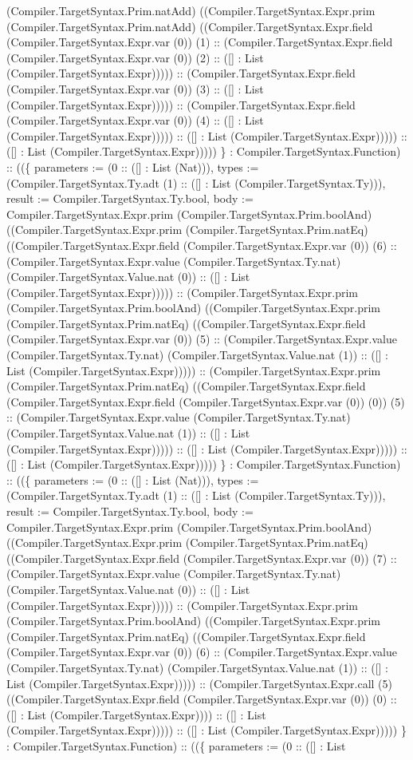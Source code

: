 \documentclass[11pt]{article}
\begin{document}
(Compiler.TargetSyntax.Prim.natAdd) ((Compiler.TargetSyntax.Expr.prim (Compiler.TargetSyntax.Prim.natAdd) ((Compiler.TargetSyntax.Expr.field (Compiler.TargetSyntax.Expr.var (0)) (1) :: (Compiler.TargetSyntax.Expr.field (Compiler.TargetSyntax.Expr.var (0)) (2) :: ([] : List (Compiler.TargetSyntax.Expr))))) :: (Compiler.TargetSyntax.Expr.field (Compiler.TargetSyntax.Expr.var (0)) (3) :: ([] : List (Compiler.TargetSyntax.Expr))))) :: (Compiler.TargetSyntax.Expr.field (Compiler.TargetSyntax.Expr.var (0)) (4) :: ([] : List (Compiler.TargetSyntax.Expr))))) :: ([] : List (Compiler.TargetSyntax.Expr))))) :: ([] : List (Compiler.TargetSyntax.Expr))))) \} : Compiler.TargetSyntax.Function) :: ((\{ parameters := (0 :: ([] : List (Nat))), types := (Compiler.TargetSyntax.Ty.adt (1) :: ([] : List (Compiler.TargetSyntax.Ty))), result := Compiler.TargetSyntax.Ty.bool, body := Compiler.TargetSyntax.Expr.prim (Compiler.TargetSyntax.Prim.boolAnd) ((Compiler.TargetSyntax.Expr.prim (Compiler.TargetSyntax.Prim.natEq) ((Compiler.TargetSyntax.Expr.field (Compiler.TargetSyntax.Expr.var (0)) (6) :: (Compiler.TargetSyntax.Expr.value (Compiler.TargetSyntax.Ty.nat) (Compiler.TargetSyntax.Value.nat (0)) :: ([] : List (Compiler.TargetSyntax.Expr))))) :: (Compiler.TargetSyntax.Expr.prim (Compiler.TargetSyntax.Prim.boolAnd) ((Compiler.TargetSyntax.Expr.prim (Compiler.TargetSyntax.Prim.natEq) ((Compiler.TargetSyntax.Expr.field (Compiler.TargetSyntax.Expr.var (0)) (5) :: (Compiler.TargetSyntax.Expr.value (Compiler.TargetSyntax.Ty.nat) (Compiler.TargetSyntax.Value.nat (1)) :: ([] : List (Compiler.TargetSyntax.Expr))))) :: (Compiler.TargetSyntax.Expr.prim (Compiler.TargetSyntax.Prim.natEq) ((Compiler.TargetSyntax.Expr.field (Compiler.TargetSyntax.Expr.field (Compiler.TargetSyntax.Expr.var (0)) (0)) (5) :: (Compiler.TargetSyntax.Expr.value (Compiler.TargetSyntax.Ty.nat) (Compiler.TargetSyntax.Value.nat (1)) :: ([] : List (Compiler.TargetSyntax.Expr))))) :: ([] : List (Compiler.TargetSyntax.Expr))))) :: ([] : List (Compiler.TargetSyntax.Expr))))) \} : Compiler.TargetSyntax.Function) :: ((\{ parameters := (0 :: ([] : List (Nat))), types := (Compiler.TargetSyntax.Ty.adt (1) :: ([] : List (Compiler.TargetSyntax.Ty))), result := Compiler.TargetSyntax.Ty.bool, body := Compiler.TargetSyntax.Expr.prim (Compiler.TargetSyntax.Prim.boolAnd) ((Compiler.TargetSyntax.Expr.prim (Compiler.TargetSyntax.Prim.natEq) ((Compiler.TargetSyntax.Expr.field (Compiler.TargetSyntax.Expr.var (0)) (7) :: (Compiler.TargetSyntax.Expr.value (Compiler.TargetSyntax.Ty.nat) (Compiler.TargetSyntax.Value.nat (0)) :: ([] : List (Compiler.TargetSyntax.Expr))))) :: (Compiler.TargetSyntax.Expr.prim (Compiler.TargetSyntax.Prim.boolAnd) ((Compiler.TargetSyntax.Expr.prim (Compiler.TargetSyntax.Prim.natEq) ((Compiler.TargetSyntax.Expr.field (Compiler.TargetSyntax.Expr.var (0)) (6) :: (Compiler.TargetSyntax.Expr.value (Compiler.TargetSyntax.Ty.nat) (Compiler.TargetSyntax.Value.nat (1)) :: ([] : List (Compiler.TargetSyntax.Expr))))) :: (Compiler.TargetSyntax.Expr.call (5) ((Compiler.TargetSyntax.Expr.field (Compiler.TargetSyntax.Expr.var (0)) (0) :: ([] : List (Compiler.TargetSyntax.Expr)))) :: ([] : List (Compiler.TargetSyntax.Expr))))) :: ([] : List (Compiler.TargetSyntax.Expr))))) \} : Compiler.TargetSyntax.Function) :: ((\{ parameters := (0 :: ([] : List 
\end{document}
